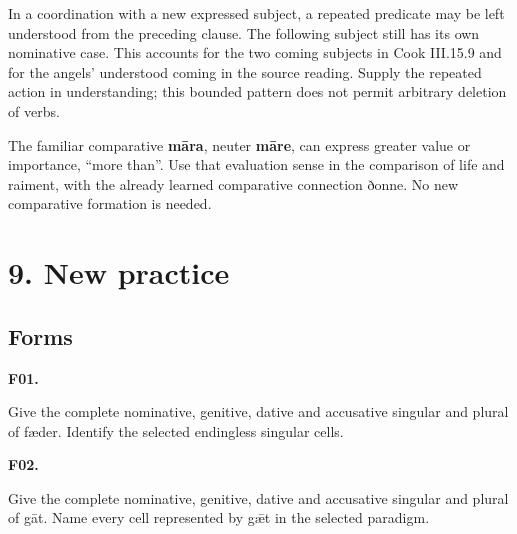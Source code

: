 In a coordination with a new expressed subject, a repeated predicate may be left understood from the preceding clause. The following subject still has its own nominative case. This accounts for the two coming subjects in Cook III.15.9 and for the angels' understood coming in the source reading. Supply the repeated action in understanding; this bounded pattern does not permit arbitrary deletion of verbs.

The familiar comparative \textbf{māra}, neuter \textbf{māre}, can express greater value or importance, “more than”. Use that evaluation sense in the comparison of life and raiment, with the already learned comparative connection ðonne. No new comparative formation is needed.

\section*{9. New practice}

\subsection*{Forms}

\par\begin{minipage}{\linewidth}\raggedright
\textbf{F01.}

Give the complete nominative, genitive, dative and accusative singular and plural of fæder. Identify the selected endingless singular cells.

\end{minipage}\par\addvspace{4pt}

\par\begin{minipage}{\linewidth}\raggedright
\textbf{F02.}

Give the complete nominative, genitive, dative and accusative singular and plural of gāt. Name every cell represented by gǣt in the selected paradigm.

\end{minipage}\par\addvspace{4pt}

